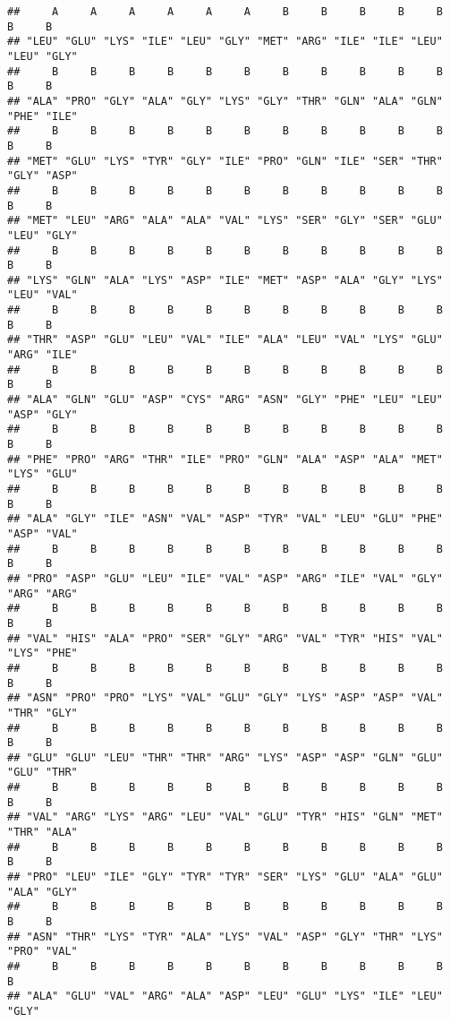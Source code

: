 \documentclass[]{article}
\begin{document}
\begin{verbatim}
##     A     A     A     A     A     A     B     B     B     B     B     B     B 
## "LEU" "GLU" "LYS" "ILE" "LEU" "GLY" "MET" "ARG" "ILE" "ILE" "LEU" "LEU" "GLY" 
##     B     B     B     B     B     B     B     B     B     B     B     B     B 
## "ALA" "PRO" "GLY" "ALA" "GLY" "LYS" "GLY" "THR" "GLN" "ALA" "GLN" "PHE" "ILE" 
##     B     B     B     B     B     B     B     B     B     B     B     B     B 
## "MET" "GLU" "LYS" "TYR" "GLY" "ILE" "PRO" "GLN" "ILE" "SER" "THR" "GLY" "ASP" 
##     B     B     B     B     B     B     B     B     B     B     B     B     B 
## "MET" "LEU" "ARG" "ALA" "ALA" "VAL" "LYS" "SER" "GLY" "SER" "GLU" "LEU" "GLY" 
##     B     B     B     B     B     B     B     B     B     B     B     B     B 
## "LYS" "GLN" "ALA" "LYS" "ASP" "ILE" "MET" "ASP" "ALA" "GLY" "LYS" "LEU" "VAL" 
##     B     B     B     B     B     B     B     B     B     B     B     B     B 
## "THR" "ASP" "GLU" "LEU" "VAL" "ILE" "ALA" "LEU" "VAL" "LYS" "GLU" "ARG" "ILE" 
##     B     B     B     B     B     B     B     B     B     B     B     B     B 
## "ALA" "GLN" "GLU" "ASP" "CYS" "ARG" "ASN" "GLY" "PHE" "LEU" "LEU" "ASP" "GLY" 
##     B     B     B     B     B     B     B     B     B     B     B     B     B 
## "PHE" "PRO" "ARG" "THR" "ILE" "PRO" "GLN" "ALA" "ASP" "ALA" "MET" "LYS" "GLU" 
##     B     B     B     B     B     B     B     B     B     B     B     B     B 
## "ALA" "GLY" "ILE" "ASN" "VAL" "ASP" "TYR" "VAL" "LEU" "GLU" "PHE" "ASP" "VAL" 
##     B     B     B     B     B     B     B     B     B     B     B     B     B 
## "PRO" "ASP" "GLU" "LEU" "ILE" "VAL" "ASP" "ARG" "ILE" "VAL" "GLY" "ARG" "ARG" 
##     B     B     B     B     B     B     B     B     B     B     B     B     B 
## "VAL" "HIS" "ALA" "PRO" "SER" "GLY" "ARG" "VAL" "TYR" "HIS" "VAL" "LYS" "PHE" 
##     B     B     B     B     B     B     B     B     B     B     B     B     B 
## "ASN" "PRO" "PRO" "LYS" "VAL" "GLU" "GLY" "LYS" "ASP" "ASP" "VAL" "THR" "GLY" 
##     B     B     B     B     B     B     B     B     B     B     B     B     B 
## "GLU" "GLU" "LEU" "THR" "THR" "ARG" "LYS" "ASP" "ASP" "GLN" "GLU" "GLU" "THR" 
##     B     B     B     B     B     B     B     B     B     B     B     B     B 
## "VAL" "ARG" "LYS" "ARG" "LEU" "VAL" "GLU" "TYR" "HIS" "GLN" "MET" "THR" "ALA" 
##     B     B     B     B     B     B     B     B     B     B     B     B     B 
## "PRO" "LEU" "ILE" "GLY" "TYR" "TYR" "SER" "LYS" "GLU" "ALA" "GLU" "ALA" "GLY" 
##     B     B     B     B     B     B     B     B     B     B     B     B     B 
## "ASN" "THR" "LYS" "TYR" "ALA" "LYS" "VAL" "ASP" "GLY" "THR" "LYS" "PRO" "VAL" 
##     B     B     B     B     B     B     B     B     B     B     B     B 
## "ALA" "GLU" "VAL" "ARG" "ALA" "ASP" "LEU" "GLU" "LYS" "ILE" "LEU" "GLY"
\end{verbatim}
\end{document}
